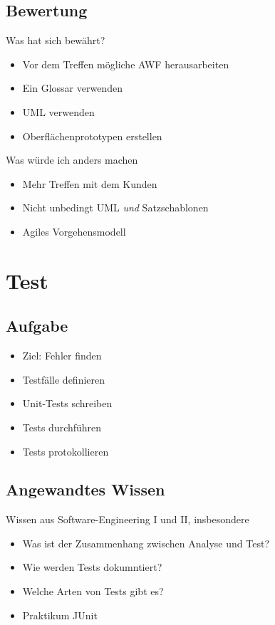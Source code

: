 \documentclass{beamer}
\begin{document}
  \subsection{Bewertung}
  \begin{frame}{\subsecname}
    \begin{block}{Was hat sich bewährt?}
      \begin{itemize}
        \item Vor dem Treffen mögliche AWF herausarbeiten
        \item Ein Glossar verwenden
        \item UML verwenden
        \item Oberflächenprototypen erstellen
      \end{itemize}
    \end{block}

    \begin{block}{Was würde ich anders machen}
      \begin{itemize}
        \item Mehr Treffen mit dem Kunden
        \item Nicht unbedingt UML \textit{und} Satzschablonen
        \item Agiles Vorgehensmodell
      \end{itemize}
    \end{block}
  \end{frame}


  \section{Test}
  \subsection{Aufgabe}
  \begin{frame}{\subsecname}
    \begin{itemize}
      \item Ziel: Fehler finden
      \item Testfälle definieren
      \item Unit-Tests schreiben
      \item Tests durchführen
      \item Tests protokollieren
    \end{itemize}
  \end{frame}

  \subsection{Angewandtes Wissen}
  \begin{frame}{\subsecname}
    Wissen aus Software-Engineering I und II, insbesondere
    \begin{itemize}
      \item Was ist der Zusammenhang zwischen Analyse und Test?
      \item Wie werden Tests dokumntiert?
      \item Welche Arten von Tests gibt es?
      \item Praktikum JUnit
    \end{itemize}
  \end{frame}
\end{document}
